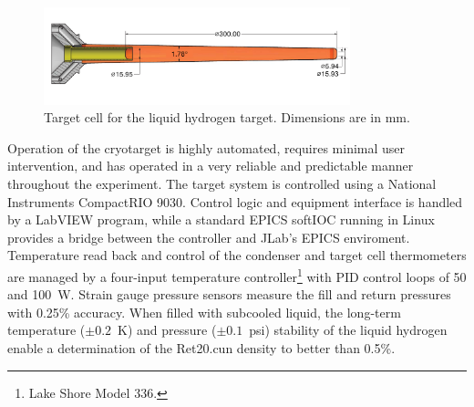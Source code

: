 \begin{figure}
\includegraphics[width=3.5in]{figures/GluexCell_mm.pdf}
\caption{Target cell for the liquid hydrogen target.  Dimensions are in mm.  }
\label{fig:TargetCell}
\end{figure}

Operation of the cryotarget is highly automated, requires minimal user intervention,
and has operated in a very reliable and predictable manner throughout the
experiment.  The target system is controlled using a
National Instruments CompactRIO 9030. 
Control logic and equipment interface is handled by a LabVIEW program, 
while a standard EPICS softIOC running in Linux provides a
bridge between the controller and JLab's EPICS enviroment.     
Temperature read back and control of the condenser and target cell thermometers
are managed by a four-input temperature
controller\footnote{Lake Shore Model 336.} with PID control loops of 50 and 100~W.
Strain gauge pressure sensors measure the fill and return pressures with 0.25\% 
accuracy.  When filled with subcooled liquid, 
the long-term temperature ($\pm 0.2$~K) and pressure ($\pm 0.1$~psi)
stability of the liquid hydrogen enable a determination of the Ret20.cun
density to better than 0.5\%.


